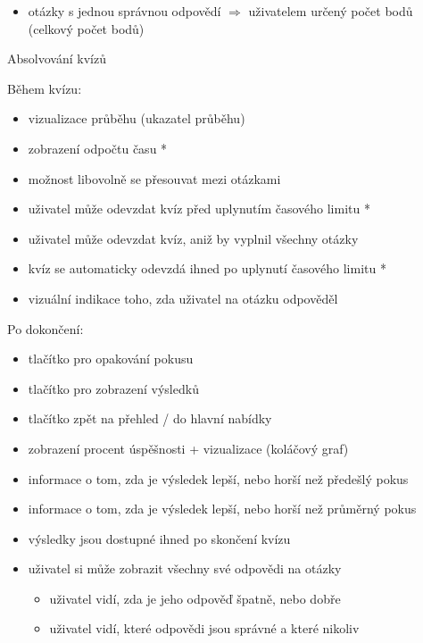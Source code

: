 \documentclass{vskpou} %
\begin{document}
\begin{itemize}
\begin{itemize}
\begin{itemize}
            \begin{itemize}
                \item $c$ = počet správných možností, které student vybral
                \item $n$ = celkový počet správných možností dostupných v dané otázce
                \item $w$ = váha (celkový počet bodů) přiřazená dané otázce (např. 10, 20 nebo 30)
            \end{itemize}
            \item otázky s jednou správnou odpovědí $\Rightarrow$ uživatelem určený počet bodů (celkový počet bodů)
        \end{itemize}
    \end{itemize}
\end{itemize}

Absolvování kvízů

Během kvízu:
\begin{itemize}
    \item vizualizace průběhu (ukazatel průběhu)
    \item zobrazení odpočtu času *
    \item možnost libovolně se přesouvat mezi otázkami
    \item uživatel může odevzdat kvíz před uplynutím časového limitu *
    \item uživatel může odevzdat kvíz, aniž by vyplnil všechny otázky
    \item kvíz se automaticky odevzdá ihned po uplynutí časového limitu *
    \item vizuální indikace toho, zda uživatel na otázku odpověděl
\end{itemize}

Po dokončení:
\begin{itemize}
    \item tlačítko pro opakování pokusu
    \item tlačítko pro zobrazení výsledků
    \item tlačítko zpět na přehled / do hlavní nabídky
    \item zobrazení procent úspěšnosti + vizualizace (koláčový graf)
    \item informace o tom, zda je výsledek lepší, nebo horší než předešlý pokus
    \item informace o tom, zda je výsledek lepší, nebo horší než průměrný pokus
    \item výsledky jsou dostupné ihned po skončení kvízu
    \item uživatel si může zobrazit všechny své odpovědi na otázky
    \begin{itemize}
        \item uživatel vidí, zda je jeho odpověď špatně, nebo dobře
        \item uživatel vidí, které odpovědi jsou správné a které nikoliv
    \end{itemize}
\end{itemize}
\end{document}
